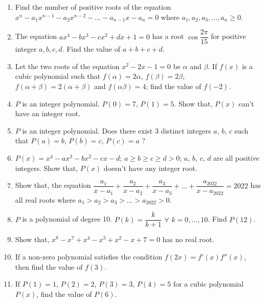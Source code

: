 \documentclass[11pt, a4paper]{article}
\begin{document}
\begin{enumerate}

	\item Find the number of positive roots of the equation $x^n - a_1 x^{n-1} - a_2 x^{n-2} - \ldots - a_{n-1}x - a_n = 0$ where $a_1, a_2, a_3, \ldots, a_n \geq 0$.
	
	\item The equation $ax^4 - bx^3 - cx^2 + dx + 1 = 0$ has a root $\cos \dfrac{2\pi}{15}$ for positive integer $a, b, c, d$. Find the value of $a+b+c+d$.
	
	\item Let the two roots of the equation $x^2 - 2x - 1 = 0$ be $\alpha$ and $\beta$. If $f(x)$ is a cubic polynomial such that $f(\alpha) = 2\alpha$, $f(\beta) = 2 \beta$, $f(\alpha + \beta) = 2(\alpha + \beta)$ and $f(\alpha \beta) = 4$; find the value of $f(-2)$.
	
	\item $P$ is an integer polynomial. $P(0) = 7$, $P(1) = 5$. Show that, $P(x)$ can't have an integer root.
	
	\item $P$ is an integer polynomial. Does there exist  3 distinct integers $a$, $b$, $c$ such that $P(a) = b$, $P(b) = c$, $P(c) = a$ ?
	
	\item $P(x) = x^4 - ax^3 - bx^2 - cx - d$; $a \geq b \geq c \geq d > 0$; $a$, $b$, $c$, $d$ are all positive integers. Show that, $P(x)$ doesn't have any integer root.
	
	\item Show that, the equation $\dfrac{a_1}{x - a_1} + \dfrac{a_2}{x- a_2} + \dfrac{a_3}{x - a_3} + \ldots + \dfrac{a_{2022}}{x - a_{2022}} = 2022$ has all real roots where $a_1 > a_2 > a_3 > \ldots > a_{2022} > 0$.
	
	\item $P$ is a polynomial of degree 10. $P(k) = \dfrac{k}{k+1}$ $\forall$ $k = 0, \ldots , 10$. Find $P(12)$.
	
	\item Show that, $x^8 - x^7 + x^4 - x^3 + x^2 - x + 7 = 0$ has no real root.
	
	\item If a non-zero polynomial satisfies the condition $f(2x) = f'(x) f''(x)$, then find the value of $f(3)$.
	
	\item If $P(1) = 1$, $P(2) = 2$, $P(3) = 3$, $P(4) = 5$ for a cubic polynomial $P(x)$, find the value of $P(6)$.
	

\end{enumerate}
\end{document}
